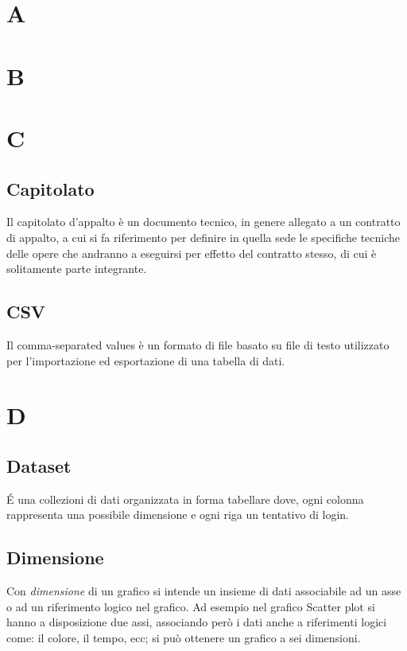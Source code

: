 \section{A}
\subsection{}

\section{B}

\section{C}
\subsection{Capitolato}
Il capitolato d'appalto è un documento tecnico, in genere allegato a un contratto di appalto, a cui si fa riferimento per definire in quella sede le specifiche tecniche delle opere che andranno a eseguirsi per effetto del contratto stesso, di cui è solitamente parte integrante.

\subsection{CSV}
Il comma-separated values è un formato di file basato su file di testo utilizzato per l'importazione ed esportazione di una tabella di dati.


\section{D}
\subsection{Dataset}
\'E una collezioni di dati organizzata in forma tabellare dove, ogni colonna rappresenta una possibile dimensione e ogni riga un tentativo di login.

\subsection{Dimensione}
Con \textit{dimensione} di un grafico si intende un insieme di dati associabile ad un asse o ad un riferimento logico nel grafico. Ad esempio nel grafico Scatter plot si hanno a disposizione due assi, associando però i dati anche a riferimenti logici come: il colore, il tempo, ecc; si può ottenere un grafico a sei dimensioni. 

